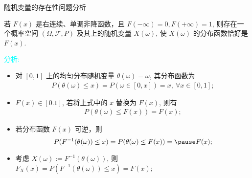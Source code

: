  \begin{frame}{随机变量的存在性问题分析}
 \begin{thm}\label{sec:existofrv}
 \hspace{-0.2cm} 若 $F (x)$ 是右连续、单调非降函数，且 $F (-\infty)=0, F (+\infty)=1$, 则存在一个概率空间 $(\Omega,\mathcal{F},P)$ 及其上的随机变量 $X (\omega)$, 使 $X (\omega)$ 的分布函数恰好是 $F (x)$.
 \end{thm}

 \textcolor{cyan}{分析:}
 \begin{itemize}[<+-|alert@+>]
	 \item 对 $[0,1]$ 上的均匀分布随机变量 $\theta (\omega)=\omega$, 其分布函数为 %
	 \begin{eqnarray*}
		 P(\theta(\omega)\le x)=P(\omega\in[0,x])=x, \ \forall x\in[0,1];
	 \end{eqnarray*}
	 \item $F (x)\in[0.1]$, 若将上式中的 $x$ 替换为 $F (x)$, 则有
		 \begin{eqnarray*}
		 P(\theta(\omega)\le F(x))=F(x);
	 \end{eqnarray*}
	 \item 若分布函数 $F (x)$ 可逆，则
	 \begin{eqnarray*}
	 P(F^{-1}(\theta(\omega))\le x)=	P(\theta(\omega)\le F(x))=\pause F(x);
	 \end{eqnarray*}

	 \item 考虑 $X (\omega):=F^{-1}(\theta (\omega))$, 则 $F_X (x)= P (F^{-1}(\theta (\omega))\le x)= F (x)$;


 \end{itemize}


 \end{frame}
